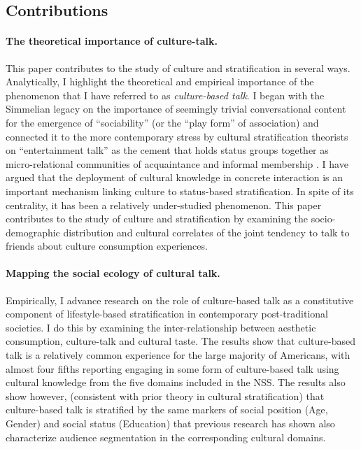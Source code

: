
\subsection{Contributions}
\paragraph{The theoretical importance of culture-talk.}
This paper contributes to the study of culture and stratification in several ways.  Analytically, I highlight the theoretical and empirical importance of the phenomenon that I have referred to as \emph{culture-based talk}. I began with the Simmelian legacy on the importance of seemingly trivial conversational content for the emergence of ``sociability'' (or the ``play form'' of association) and connected it to the more contemporary stress by cultural stratification theorists on ``entertainment talk'' as the cement that holds status groups together as micro-relational communities of acquaintance and informal membership \citep{collins75, dimaggio87, purcell07, lizardo06a}.  I have argued that the deployment of cultural knowledge in concrete interaction is an important mechanism linking culture to status-based stratification.  In spite of its centrality, it has been a relatively under-studied phenomenon. This paper contributes to the study of culture and stratification by examining the socio-demographic distribution and cultural correlates of the joint tendency to talk to friends about culture consumption experiences.  

\paragraph{Mapping the social ecology of cultural talk.}
Empirically, I advance research on the role of culture-based talk as a constitutive component of lifestyle-based stratification in contemporary post-traditional societies.  I do this by examining the inter-relationship between aesthetic consumption, culture-talk and cultural taste. The results show that culture-based talk is a relatively common experience for the large majority of Americans, with almost four fifths reporting engaging in some form of culture-based talk using cultural knowledge from the five domains included in the NSS. The results also show however, (consistent with prior theory in cultural stratification) that culture-based talk is stratified by the same markers of social position (Age, Gender) and social status (Education) that previous research has shown also characterize audience segmentation in the corresponding cultural domains.  

